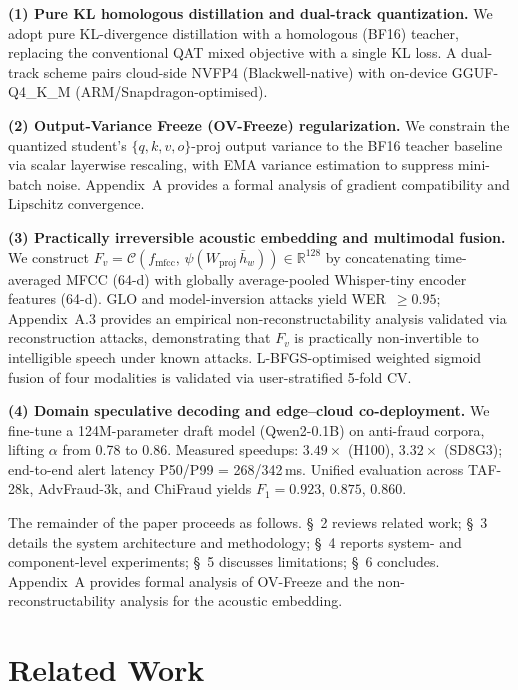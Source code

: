 \documentclass[11pt, a4paper]{article}
\begin{document}
\textbf{(1) Pure KL homologous distillation and dual-track quantization.} We adopt pure KL-divergence distillation with a homologous (BF16) teacher, replacing the conventional QAT mixed objective with a single KL loss. A dual-track scheme pairs cloud-side NVFP4 (Blackwell-native) with on-device GGUF-Q4\_K\_M (ARM/Snapdragon-optimised).

\textbf{(2) Output-Variance Freeze (OV-Freeze) regularization.} We constrain the quantized student's $\{q,k,v,o\}$-proj output variance to the BF16 teacher baseline via scalar layerwise rescaling, with EMA variance estimation to suppress mini-batch noise. Appendix~A provides a formal analysis of gradient compatibility and Lipschitz convergence.

\textbf{(3) Practically irreversible acoustic embedding and multimodal fusion.} We construct $F_v = \mathcal{C}\!\left(f_{\mathrm{mfcc}},\,\psi(W_{\mathrm{proj}}\,\bar h_w)\right) \in \mathbb{R}^{128}$ by concatenating time-averaged MFCC (64-d) with globally average-pooled Whisper-tiny encoder features (64-d). GLO and model-inversion attacks yield WER~$\ge 0.95$; Appendix~A.3 provides an empirical non-reconstructability analysis validated via reconstruction attacks, demonstrating that $F_v$ is practically non-invertible to intelligible speech under known attacks. L-BFGS-optimised weighted sigmoid fusion of four modalities is validated via user-stratified 5-fold CV.

\textbf{(4) Domain speculative decoding and edge--cloud co-deployment.} We fine-tune a 124M-parameter draft model (Qwen2-0.1B) on anti-fraud corpora, lifting $\alpha$ from 0.78 to 0.86. Measured speedups: $3.49\times$ (H100), $3.32\times$ (SD8G3); end-to-end alert latency P50/P99 = 268/342\,ms. Unified evaluation across TAF-28k, AdvFraud-3k, and ChiFraud yields $F_1 = 0.923$, $0.875$, $0.860$.

The remainder of the paper proceeds as follows. \S~2 reviews related work; \S~3 details the system architecture and methodology; \S~4 reports system- and component-level experiments; \S~5 discusses limitations; \S~6 concludes. Appendix~A provides formal analysis of OV-Freeze and the non-reconstructability analysis for the acoustic embedding.

\section{Related Work}
\end{document}
